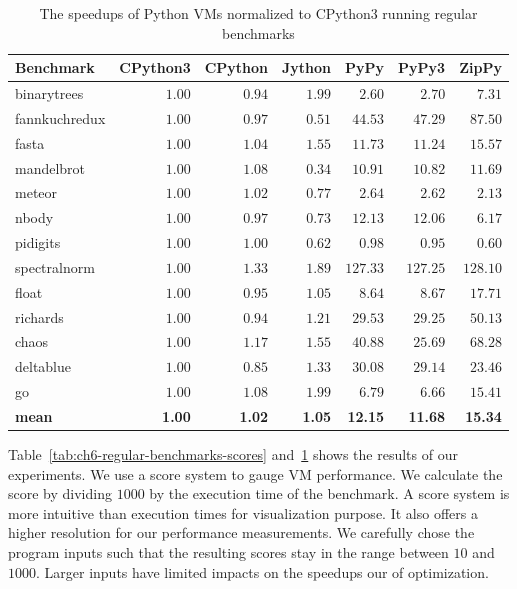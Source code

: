 \begin{table}
  \small
  \begin{center}
  \begin{tabular}{ l r r r r r r }
  \toprule
  Benchmark     & CPython3  & CPython  & Jython  & PyPy     & PyPy3    & ZipPy \\
  \midrule
  \textsf{binarytrees}   & $1.00$    & $0.94$   & $1.99$  & $2.60$   & $2.70$   & $7.31$ \\
  \textsf{fannkuchredux} & $1.00$    & $0.97$   & $0.51$  & $44.53$  & $47.29$  & $87.50$ \\
  \textsf{fasta}         & $1.00$    & $1.04$   & $1.55$  & $11.73$  & $11.24$  & $15.57$ \\
  \textsf{mandelbrot}    & $1.00$    & $1.08$   & $0.34$  & $10.91$  & $10.82$  & $11.69$ \\
  \textsf{meteor}        & $1.00$    & $1.02$   & $0.77$  & $2.64$   & $2.62$   & $2.13$ \\
  \textsf{nbody}         & $1.00$    & $0.97$   & $0.73$  & $12.13$  & $12.06$  & $6.17$ \\
  \textsf{pidigits}      & $1.00$    & $1.00$   & $0.62$  & $0.98$   & $0.95$   & $0.60$ \\
  \textsf{spectralnorm}  & $1.00$    & $1.33$   & $1.89$  & $127.33$ & $127.25$ & $128.10$ \\
  \textsf{float}         & $1.00$    & $0.95$   & $1.05$  & $8.64$   & $8.67$   & $17.71$ \\
  \textsf{richards}      & $1.00$    & $0.94$   & $1.21$  & $29.53$  & $29.25$  & $50.13$ \\
  \textsf{chaos}         & $1.00$    & $1.17$   & $1.55$  & $40.88$  & $25.69$  & $68.28$ \\
  \textsf{deltablue}     & $1.00$    & $0.85$   & $1.33$  & $30.08$  & $29.14$  & $23.46$ \\
  \textsf{go}            & $1.00$    & $1.08$   & $1.99$  & $6.79$   & $6.66$   & $15.41$ \\
  \textbf{mean}          & \textbf{1.00}    & \textbf{1.02}   & \textbf{1.05}  & \textbf{12.15}  & \textbf{11.68}  & \textbf{15.34} \\
  \bottomrule
  \end{tabular}
  \caption{The speedups of Python VMs normalized to CPython3 running regular benchmarks}
  \label{tab:ch6-regular-benchmarks-speedups}
  \end{center}
\end{table}

Table~\ref{tab:ch6-regular-benchmarks-scores} and~\ref{tab:ch6-regular-benchmarks-speedups} shows the results of our experiments.
We use a score system to gauge VM performance.
We calculate the score by dividing $1000$ by the execution time of the benchmark.
A score system is more intuitive than execution times for visualization purpose.
It also offers a higher resolution for our performance measurements.
We carefully chose the program inputs such that the resulting scores stay in the range between $10$ and $1000$.
Larger inputs have limited impacts on the speedups our of optimization.

